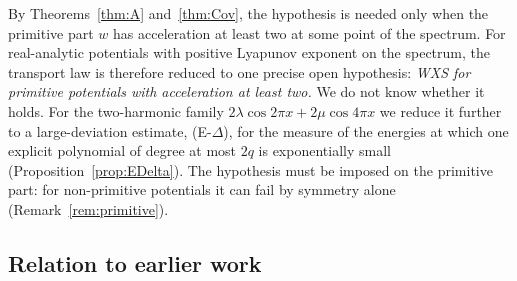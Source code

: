 By Theorems~\ref{thm:A} and~\ref{thm:Cov}, the hypothesis is needed only when the primitive part $w$ has acceleration at least two at some point of the spectrum. For real-analytic potentials with positive Lyapunov exponent on the spectrum, the transport law is therefore reduced to one precise open hypothesis: \emph{WXS for primitive potentials with acceleration at least two.} We do not know whether it holds. For the two-harmonic family $2\lambda\cos2\pi x+2\mu\cos4\pi x$ we reduce it further to a large-deviation estimate, (E-$\Delta$), for the measure of the energies at which one explicit polynomial of degree at most $2q$ is exponentially small (Proposition~\ref{prop:EDelta}). The hypothesis must be imposed on the primitive part: for non-primitive potentials it can fail by symmetry alone (Remark~\ref{rem:primitive}).

\subsection{Relation to earlier work}

